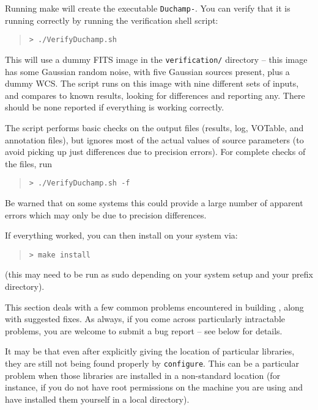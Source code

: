 
Running make will create the executable \texttt{Duchamp-{\version}}. You can
verify that it is running correctly by running the verification shell
script:
\begin{quote}
{\footnotesize
\texttt{> ./VerifyDuchamp.sh}
}
\end{quote}
This will use a dummy FITS image in the \texttt{verification/}
directory -- this image has some Gaussian random noise, with five
Gaussian sources present, plus a dummy WCS. The script runs
\duchamp on this image with nine different sets of inputs, and
compares to known results, looking for differences and reporting
any. There should be none reported if everything is working
correctly. 

The script performs basic checks on the output files (results, log,
VOTable, and annotation files), but ignores most of the actual values
of source parameters (to avoid picking up just differences due to
precision errors). For complete checks of the files, run
\begin{quote}
  {\footnotesize
    \texttt{> ./VerifyDuchamp.sh -f}
  }
\end{quote}
Be warned that on some systems this could provide a large number of
apparent errors which may only be due to precision differences.

If everything worked, you can then install \duchamp on your system via:
\begin{quote}
{\footnotesize
\texttt{> make install}
}
\end{quote}
(this may need to be run as sudo depending on your system setup and
your prefix directory).


This section deals with a few common problems encountered in building
\duchamp, along with suggested fixes. As always, if you come across
particularly intractable problems, you are welcome to submit a bug
report -- see below for details.


It may be that even after explicitly giving the location of particular
libraries, they are still not being found properly by
\texttt{configure}. This can be a particular problem when those
libraries are installed in a non-standard location (for instance, if
you do not have root permissions on the machine you are using and have
installed them yourself in a local directory).

